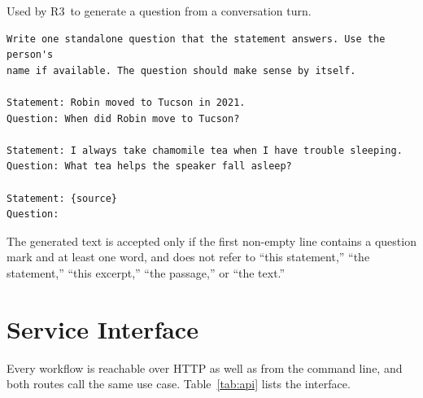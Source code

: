 \documentclass[12pt,letterpaper,oneside]{report}
\newcommand{\Rc}{R3}
\begin{document}
Used by \Rc\ to generate a question from a conversation turn.

\begin{singlespace}
\begin{lstlisting}
Write one standalone question that the statement answers. Use the person's
name if available. The question should make sense by itself.

Statement: Robin moved to Tucson in 2021.
Question: When did Robin move to Tucson?

Statement: I always take chamomile tea when I have trouble sleeping.
Question: What tea helps the speaker fall asleep?

Statement: {source}
Question:
\end{lstlisting}
\end{singlespace}

The generated text is accepted only if the first non-empty line contains a
question mark and at least one word, and does not refer to ``this statement,''
``the statement,'' ``this excerpt,'' ``the passage,'' or ``the text.''

\chapter{Service Interface}
\label{app:api}

Every workflow is reachable over HTTP as well as from the command line, and
both routes call the same use case. Table~\ref{tab:api} lists the interface.
\end{document}
